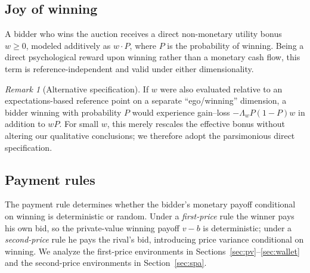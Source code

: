 \documentclass[11pt,a4paper]{article}
\theoremstyle{remark}
\newtheorem{remark}{Remark}
\begin{document}
\subsection{Joy of winning}
A bidder who wins the auction receives a direct non-monetary utility bonus $w\ge0$,
modeled additively as $w\cdot P$, where $P$ is the probability of winning. Being a
direct psychological reward upon winning rather than a monetary cash flow, this term
is reference-independent and valid under either dimensionality.

\begin{remark}[Alternative specification]
If $w$ were also evaluated relative to an expectations-based reference point on a
separate ``ego/winning'' dimension, a bidder winning with probability $P$ would
experience gain--loss $-\Lambda_w P(1-P)w$ in addition to $wP$. For small $w$, this
merely rescales the effective bonus without altering our qualitative conclusions; we
therefore adopt the parsimonious direct specification.
\end{remark}

\subsection{Payment rules}
The payment rule determines whether the bidder's monetary payoff conditional on
winning is deterministic or random. Under a \emph{first-price} rule the winner pays
his own bid, so the private-value winning payoff $v-b$ is deterministic; under a
\emph{second-price} rule he pays the rival's bid, introducing price variance
conditional on winning. We analyze the first-price environments in
Sections~\ref{sec:pv}--\ref{sec:wallet} and the second-price environments in
Section~\ref{sec:spa}.
\end{document}
